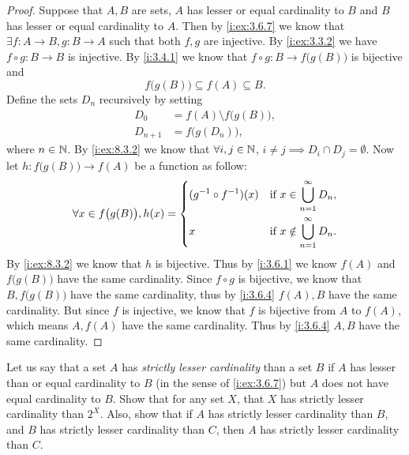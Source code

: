 \begin{proof}
  Suppose that \(A, B\) are sets, \(A\) has lesser or equal cardinality to \(B\) and \(B\) has lesser or equal cardinality to \(A\).
  Then by \cref{i:ex:3.6.7} we know that \(\exists f : A \to B, g : B \to A\) such that both \(f, g\) are injective.
  By \cref{i:ex:3.3.2} we have \(f \circ g : B \to B\) is injective.
  By \cref{i:3.4.1} we know that \(f \circ g : B \to f\big(g(B)\big)\) is bijective and
  \[
    f\big(g(B)\big) \subseteq f(A) \subseteq B.
  \]
  Define the sets \(D_n\) recursively by setting
  \begin{align*}
    D_0       & = f(A) \setminus f\big(g(B)\big), \\
    D_{n + 1} & = f\big(g(D_n)\big),
  \end{align*}
  where \(n \in \mathbb{N}\).
  By \cref{i:ex:8.3.2} we know that \(\forall i, j \in \mathbb{N}\), \(i \neq j \implies D_i \cap D_j = \emptyset\).
  Now let \(h : f\big(g(B)\big) \to f(A)\) be a function as follow:
  \[
    \forall x \in f\big(g(B)\big), h(x) = \begin{dcases}
      (g^{-1} \circ f^{-1})(x) & \text{if } x \in \bigcup_{n = 1}^\infty D_n,    \\
      x                        & \text{if } x \notin \bigcup_{n = 1}^\infty D_n.
    \end{dcases}
  \]
  By \cref{i:ex:8.3.2} we know that \(h\) is bijective.
  Thus by \cref{i:3.6.1} we know \(f(A)\) and \(f\big(g(B)\big)\) have the same cardinality.
  Since \(f \circ g\) is bijective, we know that \(B, f\big(g(B)\big)\) have the same cardinality, thus by \cref{i:3.6.4} \(f(A), B\) have the same cardinality.
  But since \(f\) is injective, we know that \(f\) is bijective from \(A\) to \(f(A)\), which means \(A, f(A)\) have the same cardinality.
  Thus by \cref{i:3.6.4} \(A, B\) have the same cardinality.
\end{proof}

\begin{ex}\label{i:ex:8.3.4}
  Let us say that a set \(A\) has \emph{strictly lesser cardinality} than a set \(B\) if \(A\) has lesser than or equal cardinality to \(B\) (in the sense of \cref{i:ex:3.6.7}) but \(A\) does not have equal cardinality to \(B\).
  Show that for any set \(X\), that \(X\) has strictly lesser cardinality than \(2^X\).
  Also, show that if \(A\) has strictly lesser cardinality than \(B\), and \(B\) has strictly lesser cardinality than \(C\), then \(A\) has strictly lesser cardinality than \(C\).
\end{ex}

